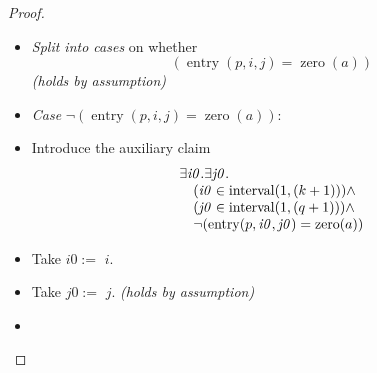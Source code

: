 \documentclass[11pt]{article}
\theoremstyle{plain}
\begin{document}
\begin{proof}
\begin{itemize}[leftmargin=2.8em, itemsep=4pt, parsep=1pt]
  \item[\textbf{101--118}] \emph{Split into cases} on whether
\begin{equation*}
(\operatorname{entry}(p, i, j) = \operatorname{zero}(a))
\end{equation*}
  \emph{(holds by assumption)}
  \item[]\emph{Case} $\lnot (\operatorname{entry}(p, i, j) = \operatorname{zero}(a))$:
  \item[\textbf{119}] Introduce the auxiliary claim
\begin{equation*}
\begin{array}{@{}l@{}} \exists \mathit{i0}. \exists \mathit{j0}. \\ \quad (\mathit{i0} \in \operatorname{interval}(1, (k + 1))) \wedge \\ \quad (\mathit{j0} \in \operatorname{interval}(1, (q + 1))) \wedge \\ \quad \neg (\operatorname{entry}(p, \mathit{i0}, \mathit{j0}) = \operatorname{zero}(a)) \end{array}
\end{equation*}

  \item[\textbf{120}] Take $\mathit{i0} :=$ $i$.
  \item[\textbf{121--126}] Take $\mathit{j0} :=$ $j$.  \emph{(holds by assumption)}
  \item[\textbf{127}] 
\end{itemize}
\end{proof}
\end{document}
